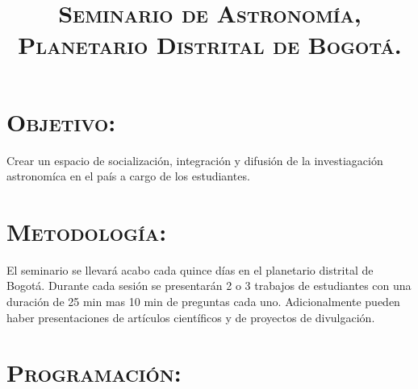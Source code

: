 \documentclass[12pt]{article}
\title{\textsc{Seminario de Astronom\'ia,\\ Planetario Distrital de Bogot\'a.}}
\begin{document}
\date{}
\maketitle

\section*{\textsc{Objetivo:}}
Crear un espacio de socializaci\'on, integraci\'on y difusi\'on de la investiagaci\'on astronom\'ica en el pa\'is
a cargo de los estudiantes.     

\section*{\textsc{Metodolog\'ia:}}
El seminario se llevar\'a acabo cada quince d\'ias en el planetario distrital de Bogot\'a.
Durante cada sesi\'on se presentar\'an 2 o 3 trabajos de estudiantes con una duraci\'on de 25 min mas 10 min de 
preguntas cada uno. Adicionalmente pueden haber presentaciones de art\'iculos cient\'ificos y de proyectos de divulgaci\'on.


\section*{\textsc{Programaci\'on:}}
\end{document}
